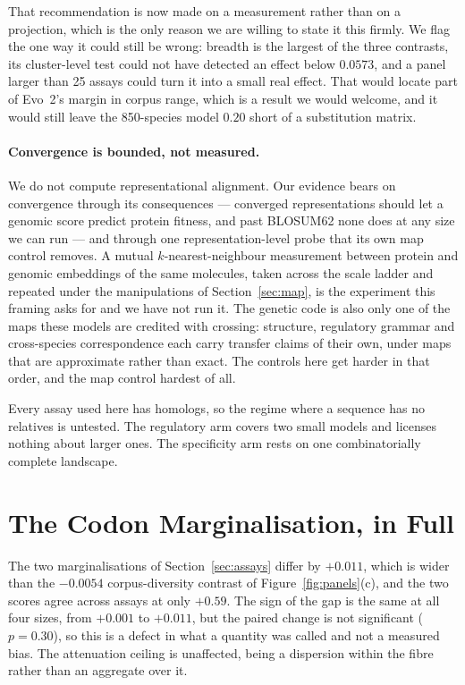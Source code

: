 \documentclass[11pt]{article}
\begin{document}
That recommendation is now made on a measurement rather than on a projection, which
is the only reason we are willing to state it this firmly. We flag the one way it
could still be wrong: breadth is the largest of the three contrasts, its cluster-level
test could not have detected an effect below $0.0573$, and a panel larger than 25
assays could turn it into a small real effect. That would locate part of Evo~2's
margin in corpus range, which is a result we would welcome, and it would still leave
the 850-species model $0.20$ short of a substitution matrix.

\paragraph{Convergence is bounded, not measured.} We do not compute
representational alignment. Our evidence bears on convergence through its
consequences --- converged representations should let a genomic score predict
protein fitness, and past BLOSUM62 none does at any size we can run --- and
through one representation-level probe that its own map control removes. A mutual
$k$-nearest-neighbour measurement between protein and genomic embeddings of the
same molecules, taken across the scale ladder and repeated under the manipulations
of Section~\ref{sec:map}, is the experiment this framing asks for and we have not
run it. The genetic code is also only one of the maps these models are credited
with crossing: structure, regulatory grammar and cross-species correspondence each
carry transfer claims of their own, under maps that are approximate rather than
exact. The controls here get harder in that order, and the map control hardest of
all.

Every assay used here has homologs, so the regime where a sequence has no relatives
is untested. The regulatory arm covers two small models and licenses nothing about
larger ones. The specificity arm rests on one combinatorially complete landscape.



\clearpage
\appendix

\section{The Codon Marginalisation, in Full}
\label{sec:codon}

The two marginalisations of Section~\ref{sec:assays} differ by $+0.011$, which is
wider than the $-0.0054$ corpus-diversity contrast of
Figure~\ref{fig:panels}(c), and the two scores agree across assays at only
$+0.59$. The sign of the gap is the same at all four sizes, from $+0.001$ to
$+0.011$, but the paired change is not significant ($p=0.30$), so this is a
defect in what a quantity was called and not a measured bias. The attenuation
ceiling is unaffected, being a dispersion within the fibre rather than an
aggregate over it.
\end{document}
